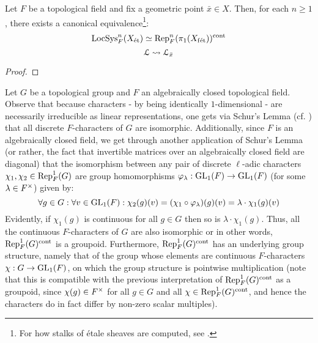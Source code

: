         \begin{lemma} \label{lemma: representations_of_the_etale_fundamental_group}
            Let $F$ be a topological field and fix a geometric point $\bar{x} \in X$. Then, for each $n \geq 1$, there exists a canonical equivalence\footnote{For how stalks of \'etale sheaves are computed, see \cite[\href{https://stacks.math.columbia.edu/tag/03PN}{Tag 03PN}]{stacks}.}:
                $$\mathrm{LocSys}_F^n(X_{\mathrm{\acute{e}t}}) \simeq \mathrm{Rep}_F^n(\pi_1(X_{\mathrm{f\acute{e}t}}))^{\mathrm{cont}}$$
                $$\mathcal{L} \leadsto \mathcal{L}_{\bar{x}}$$
        \end{lemma}
            \begin{proof}
                
            \end{proof}
        \begin{remark} \label{remark: groupoids_of_characters}
            Let $G$ be a topological group and $F$ an algebraically closed topological field. Observe that because characters - by being identically $1$-dimensional - are necessarily irreducible as linear representations, one gets via Schur's Lemma (cf. \cite[Lemma 3.6, pp. 35]{lam_first_course_in_noncommutative_rings}) that all discrete $F$-characters of $G$ are isomorphic. Additionally, since $F$ is an algebraically closed field, we get through another application of Schur's Lemma (or rather, the fact that invertible matrices over an algebraically closed field are diagonal) that the isomorphism between any pair of discrete $\ell$-adic characters $\chi_1, \chi_2 \in \mathrm{Rep}^1_F(G)$ are group homomorphisms $\varphi_{\lambda}: \operatorname{GL}_1(F) \to \operatorname{GL}_1(F)$ (for some $\lambda \in F^{\x}$) given by:
                $$\forall g \in G: \forall v \in \operatorname{GL}_1(F): \chi_2(g)(v) = (\chi_1 \circ \varphi_{\lambda})(g)(v) = \lambda \cdot \chi_1(g)(v)$$
            Evidently, if $\chi_1(g)$ is continuous for all $g \in G$ then so is $\lambda \cdot \chi_1(g)$. Thus, all the continuous $F$-characters of $G$ are also isomorphic or in other words, $\mathrm{Rep}^1_F(G)^{\mathrm{cont}}$ is a groupoid. Furthermore, $\mathrm{Rep}^1_F(G)^{\mathrm{cont}}$ has an underlying group structure, namely that of the group whose elements are continuous $F$-characters $\chi: G \to \operatorname{GL}_1(F)$, on which the group structure is pointwise multiplication (note that this is compatible with the previous interpretation of $\mathrm{Rep}^1_F(G)^{\mathrm{cont}}$ as a groupoid, since $\chi(g) \in F^{\x}$ for all $g \in G$ and all $\chi \in \mathrm{Rep}^1_F(G)^{\mathrm{cont}}$, and hence the characters do in fact differ by non-zero scalar multiples).
        \end{remark}
